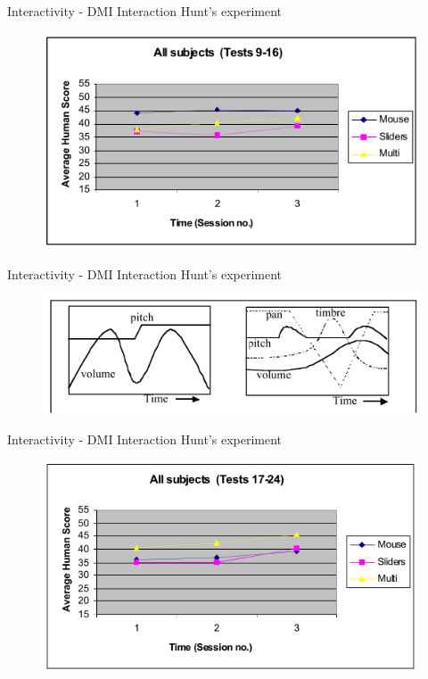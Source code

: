\documentclass{beamer}
\begin{document}
\begin{frame}{Interactivity - DMI Interaction} 
    Hunt's experiment\\
    \vspace{5mm}
    \begin{figure}[h]
        \includegraphics[width=\textwidth]{hunt2000_result2.png}
    \end{figure}
\end{frame}

\begin{frame}{Interactivity - DMI Interaction} 
    Hunt's experiment\\
    \vspace{5mm}
    \begin{figure}[h]
        \includegraphics[width=\textwidth]{hunt2000_groupC.png}
    \end{figure}
\end{frame}

\begin{frame}{Interactivity - DMI Interaction} 
    Hunt's experiment\\
    \vspace{5mm}
    \begin{figure}[h]
        \includegraphics[width=\textwidth]{hunt2000_result3.png}
    \end{figure}
\end{frame}
\end{document}
